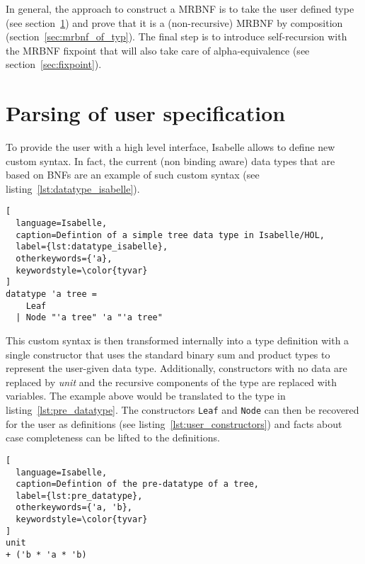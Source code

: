 In general, the approach to construct a \ac{MRBNF} is to take the user defined type (see section~\ref{sec:user_spec}) and prove that it is a (non-recursive) \ac{MRBNF} by composition (section~\ref{sec:mrbnf_of_typ}). The final step is to introduce self-recursion with the \ac{MRBNF} fixpoint that will also take care of alpha-equivalence (see section~\ref{sec:fixpoint}).

\section{Parsing of user specification}\label{sec:user_spec}

To provide the user with a high level interface, Isabelle allows to define new custom syntax. In fact, the current (non binding aware) data types that are based on \acp{BNF} are an example of such custom syntax (see listing~\ref{lst:datatype_isabelle}).

\begin{minipage}{\textwidth}
\begin{lstlisting}[
  language=Isabelle,
  caption=Defintion of a simple tree data type in Isabelle/HOL,
  label={lst:datatype_isabelle},
  otherkeywords={'a},
  keywordstyle=\color{tyvar}
]
datatype 'a tree =
    Leaf
  | Node "'a tree" 'a "'a tree"
\end{lstlisting}
\end{minipage}

This custom syntax is then transformed internally into a type definition with a single constructor that uses the standard binary sum and product types to represent the user-given data type. Additionally, constructors with no data are replaced by \textit{unit} and the recursive components of the type are replaced with variables. The example above would be translated to the type in listing~\ref{lst:pre_datatype}. The constructors \texttt{Leaf} and \texttt{Node} can then be recovered for the user as definitions (see listing~\ref{lst:user_constructors}) and facts about case completeness can be lifted to the definitions.

\begin{minipage}{\textwidth}
\begin{lstlisting}[
  language=Isabelle,
  caption=Defintion of the pre-datatype of a tree,
  label={lst:pre_datatype},
  otherkeywords={'a, 'b},
  keywordstyle=\color{tyvar}
]
unit
+ ('b * 'a * 'b)
\end{lstlisting}
\end{minipage}


